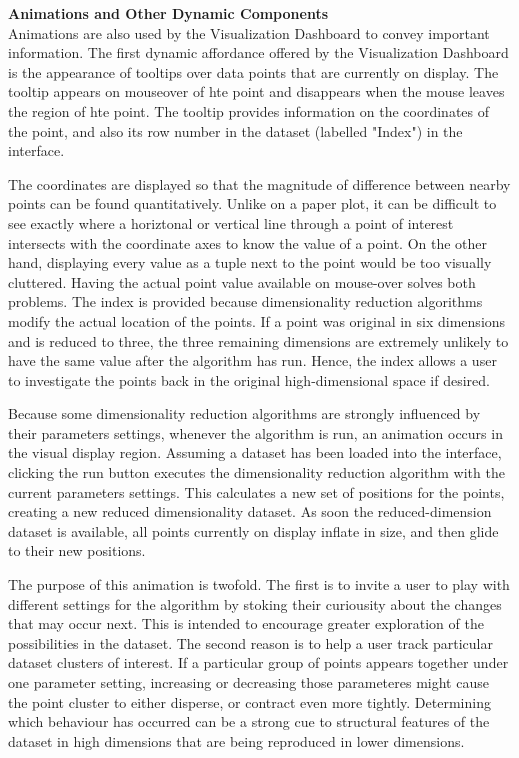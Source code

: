 \documentclass{sigchi}
\begin{document}
\textbf{Animations and Other Dynamic Components}\\
Animations are also used by the Visualization Dashboard to convey important information. The first dynamic affordance offered by the Visualization Dashboard is the appearance of tooltips over data points that are currently on display. The tooltip appears on mouseover of hte point and disappears when the mouse leaves the region of hte point. The tooltip provides information on the coordinates of the point, and also its row number in the dataset (labelled "Index") in the interface. 

The coordinates are displayed so that the magnitude of difference between nearby points can be found quantitatively. Unlike on a paper plot, it can be difficult to see exactly where a horiztonal or vertical line through a point of interest intersects with the coordinate axes to know the value of a point. On the other hand, displaying every value as a tuple next to the point would be too visually cluttered. Having the actual point value available on mouse-over solves both problems. The index is provided because dimensionality reduction algorithms modify the actual location of the points. If a point was original in six dimensions and is reduced to three, the three remaining dimensions are extremely unlikely to have the same value after the algorithm has run. Hence, the index allows a user to investigate the points back in the original high-dimensional space if desired.

Because some dimensionality reduction algorithms are strongly influenced by their parameters settings, whenever the algorithm is run, an animation occurs in the visual display region. Assuming a dataset has been loaded into the interface, clicking the run button executes the dimensionality reduction algorithm with the current parameters settings. This calculates a new set of positions for the points, creating a new reduced dimensionality dataset. As soon the reduced-dimension dataset is available, all points currently on display inflate in size, and then glide to their new positions.

The purpose of this animation is twofold. The first is to invite a user to play with different settings for the algorithm by stoking their curiousity about the changes that may occur next. This is intended to encourage greater exploration of the possibilities in the dataset. The second reason is to help a user track particular dataset clusters of interest. If a particular group of points appears together under one parameter setting, increasing or decreasing those parameteres might cause the point cluster to either disperse, or contract even more tightly. Determining which behaviour has occurred can be a strong cue to structural features of the dataset in high dimensions that are being reproduced in lower dimensions.
\end{document}
